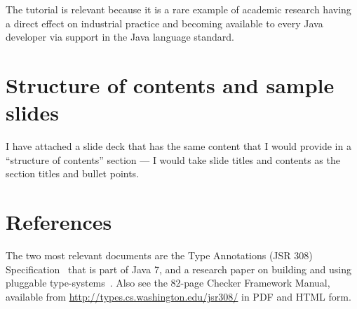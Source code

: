 \documentclass{sig-alternate} %
\begin{document}
The tutorial is relevant because it is a rare example of academic research
having a direct effect on industrial practice and becoming available to
every Java developer via support in the Java language standard.


\section{Structure of contents and sample slides}

I have attached a slide deck that has the same content that I would provide
in a ``structure of contents'' section --- I would take slide titles and
contents as the section titles and bullet points.


\section{References}

The two most relevant documents are the Type Annotations (JSR 308)
Specification~\cite{JSR308} that is part of Java 7, and a research paper on
building and using pluggable type-systems~\cite{PapiACPE2008}.  Also see
the 82-page Checker Framework Manual, available from
\url{http://types.cs.washington.edu/jsr308/} in PDF and HTML form.



\end{document}

